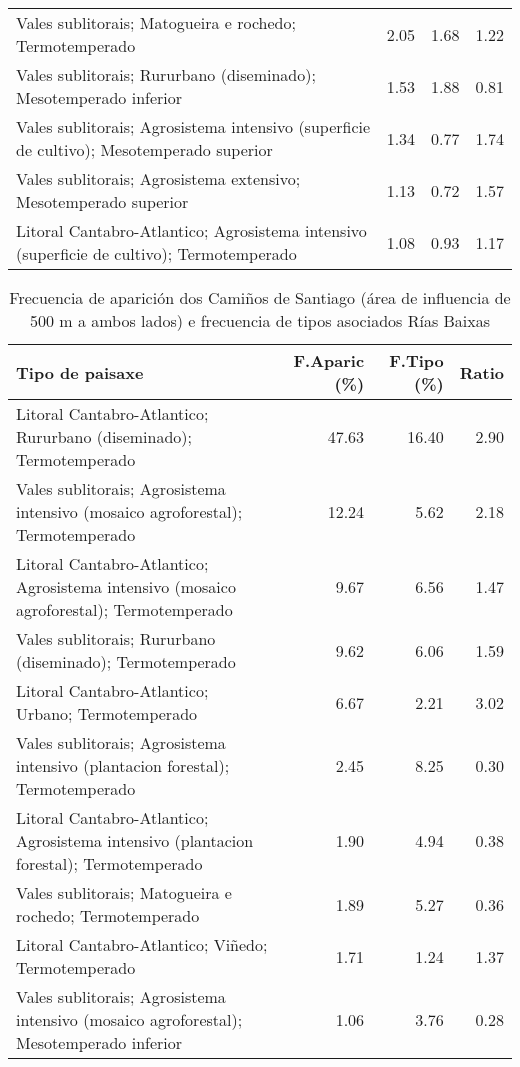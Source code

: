 \begin{table}[p]
\begin{tabular}{lrrr}
  Vales sublitorais; Matogueira e rochedo; Termotemperado & 2.05 & 1.68 & 1.22 \\ 
  Vales sublitorais; Rururbano (diseminado); Mesotemperado inferior & 1.53 & 1.88 & 0.81 \\ 
  Vales sublitorais; Agrosistema intensivo (superficie de cultivo); Mesotemperado superior & 1.34 & 0.77 & 1.74 \\ 
  Vales sublitorais; Agrosistema extensivo; Mesotemperado superior & 1.13 & 0.72 & 1.57 \\ 
  Litoral Cantabro-Atlantico; Agrosistema intensivo (superficie de cultivo); Termotemperado & 1.08 & 0.93 & 1.17 \\ 
   \hline
\end{tabular}
\end{table}
\begin{table}[p]
\centering
\caption{Frecuencia de aparición dos Camiños de Santiago (área de influencia de 500 m a ambos lados) e frecuencia de tipos asociados Rías Baixas} 
\label{vcamino12}
\begin{tabular}{lrrr}
  \hline
Tipo de paisaxe & F.Aparic (\%) & F.Tipo (\%) & Ratio \\ 
  \hline
Litoral Cantabro-Atlantico; Rururbano (diseminado); Termotemperado & 47.63 & 16.40 & 2.90 \\ 
  Vales sublitorais; Agrosistema intensivo (mosaico agroforestal); Termotemperado & 12.24 & 5.62 & 2.18 \\ 
  Litoral Cantabro-Atlantico; Agrosistema intensivo (mosaico agroforestal); Termotemperado & 9.67 & 6.56 & 1.47 \\ 
  Vales sublitorais; Rururbano (diseminado); Termotemperado & 9.62 & 6.06 & 1.59 \\ 
  Litoral Cantabro-Atlantico; Urbano; Termotemperado & 6.67 & 2.21 & 3.02 \\ 
  Vales sublitorais; Agrosistema intensivo (plantacion forestal); Termotemperado & 2.45 & 8.25 & 0.30 \\ 
  Litoral Cantabro-Atlantico; Agrosistema intensivo (plantacion forestal); Termotemperado & 1.90 & 4.94 & 0.38 \\ 
  Vales sublitorais; Matogueira e rochedo; Termotemperado & 1.89 & 5.27 & 0.36 \\ 
  Litoral Cantabro-Atlantico; Viñedo; Termotemperado & 1.71 & 1.24 & 1.37 \\ 
  Vales sublitorais; Agrosistema intensivo (mosaico agroforestal); Mesotemperado inferior & 1.06 & 3.76 & 0.28 \\ 
   \hline
\end{tabular}
\end{table}
